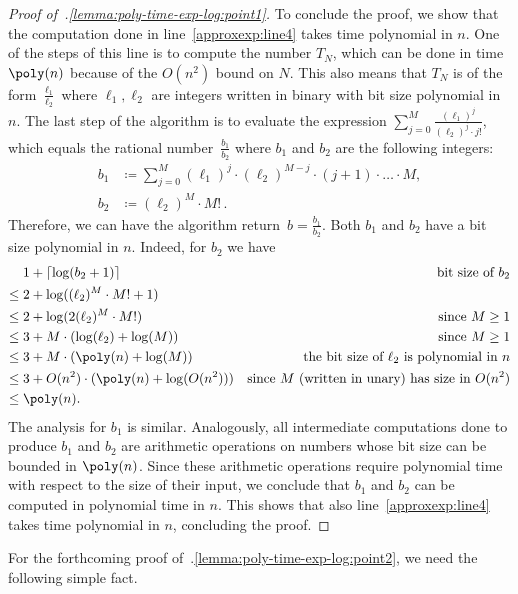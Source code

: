 \begin{proof}[Proof of~.\ref{lemma:poly-time-exp-log:point1}]
  To conclude the proof, we show that the computation done in
  line~\ref{approxexp:line4} takes time polynomial in $n$. One of the steps of
  this line is to compute the number $T_N$, which can be done in time $\poly(n)$
  because of the $O(n^2)$ bound on $N$. This also means that $T_N$ is of the
  form $\frac{\ell_1}{\ell_2}$ where $\ell_1,\ell_2$ are integers written in
  binary with bit size polynomial in $n$. The last step of the algorithm is to
  evaluate the expression $\sum_{j=0}^{M} \frac{(\ell_1)^j}{(\ell_2)^j \cdot
  j!}$, which equals the rational number~$\frac{b_1}{b_2}$ 
  where $b_1$ and $b_2$ are the following integers:
  \begin{align*}
    b_1 &\coloneqq \sum_{j=0}^M (\ell_1)^j \cdot
        (\ell_2)^{M-j} \cdot (j+1) \cdot {\dots} \cdot M,\\
    b_2 &\coloneqq (\ell_2)^M \cdot M!\,.
  \end{align*}
  Therefore, we can have the algorithm return~$b = \frac{b_1}{b_2}$. Both $b_1$ and $b_2$ have a bit size polynomial in $n$.
  Indeed, for $b_2$ we have 
  \begin{align*}
          &1+\ceil{\log(b_2+1)} &\text{bit size of $b_2$}\\
    \leq{}&2+\log((\ell_2)^M \cdot M!+1)\\
    \leq{}&2+\log(2(\ell_2)^M \cdot M!) &\text{since $M \geq 1$}\\
    \leq{}&3+M \cdot (\log(\ell_2) + \log(M)) &\text{since $M \geq 1$}\\
    \leq{}&3+ M \cdot (\poly(n) + \log(M)) &\text{the bit size of $\ell_2$ is polynomial in $n$}\\
    \leq{}&3+ O(n^2) \cdot (\poly(n) + \log(O(n^2))) &\text{since $M$ (written in unary) has size in $O(n^2)$}\\
    \leq{}&\poly(n).
  \end{align*}
  The analysis for $b_1$ is similar. Analogously, all intermediate computations
  done to produce $b_1$ and $b_2$ are arithmetic operations on numbers whose bit
  size can be bounded in $\poly(n)$. Since these arithmetic operations require
  polynomial time with respect to the size of their input, we conclude that
  $b_1$ and $b_2$ can be computed in polynomial time in $n$. 
  This shows that also line~\ref{approxexp:line4} takes time polynomial in $n$,
  concluding the proof. 
\end{proof}

For the forthcoming proof of~.\ref{lemma:poly-time-exp-log:point2}, we need the following simple fact. 

